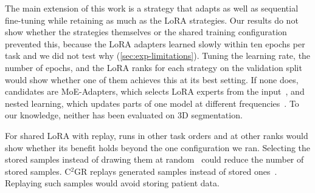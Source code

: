 The main extension of this work is a strategy that adapts as well as sequential fine-tuning while retaining as much as the LoRA strategies.
Our results do not show whether the strategies themselves or the shared training configuration prevented this, because the LoRA adapters learned slowly within ten epochs per task and we did not test why (\cref{sec:exp-limitations}).
Tuning the learning rate, the number of epochs, and the LoRA ranks for each strategy on the validation split would show whether one of them achieves this at its best setting.
If none does, candidates are MoE-Adapters, which selects LoRA experts from the input~\cite{yu2024boostingcontinuallearningvisionlanguage}, and nested learning, which updates parts of one model at different frequencies~\cite{behrouz2025nestedlearning}.
To our knowledge, neither has been evaluated on 3D segmentation.

For shared LoRA with replay, runs in other task orders and at other ranks would show whether its benefit holds beyond the one configuration we ran.
Selecting the stored samples instead of drawing them at random~\cite{memory_replay_cropping,gao2026medpeftcl} could reduce the number of stored samples.
C$^2$GR replays generated samples instead of stored ones~\cite{li2026c2gr}.
Replaying such samples would avoid storing patient data.

